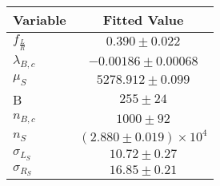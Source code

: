 \begin{tabular}[t]{lc}
\hline
Variable &Fitted Value\\
\hline\hline
$f_{\frac{L}{R}}$&$0.390\pm0.022$\\
\hline
$\lambda_{B,c}$&$-0.00186\pm0.00068$\\
\hline
$\mu_S$&$5278.912\pm0.099$\\
\hline
B&$255\pm24$\\
\hline
$n_{B,c}$&$1000\pm92$\\
\hline
$n_S$&$(2.880\pm0.019)\times 10^4$\\
\hline
$\sigma_{L_S}$&$10.72\pm0.27$\\
\hline
$\sigma_{R_S}$&$16.85\pm0.21$\\
\hline
\end{tabular}